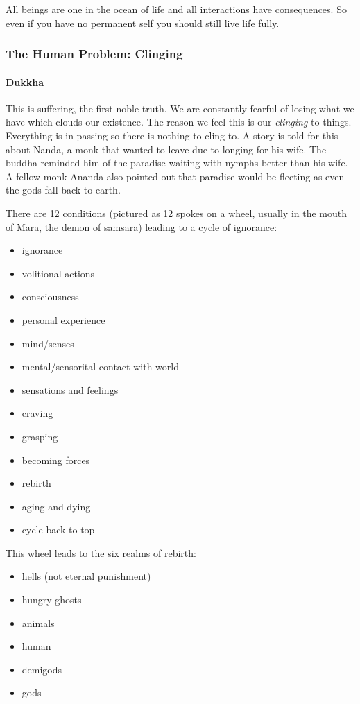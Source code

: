\documentclass{article}
\begin{document}
All beings are one in the ocean of life and all interactions have consequences. So even if you have no permanent self you should still live life fully.

\subsubsection*{The Human Problem: Clinging}
\label{ssub:the_human_problem_clinging}

\paragraph{Dukkha}
\label{par:dukkha}
This is suffering, the first noble truth. We are constantly fearful of losing what we have which clouds our existence. The reason we feel this is our \emph{clinging} to things. Everything is in passing so there is nothing to cling to. A story is told for this about Nanda, a monk that wanted to leave due to longing for his wife. The buddha reminded him of the paradise waiting with nymphs better than his wife. A fellow monk Ananda also pointed out that paradise would be fleeting as even the gods fall back to earth.

There are 12 conditions (pictured as 12 spokes on a wheel, usually in the mouth of Mara, the demon of samsara) leading to a cycle of ignorance:
\begin{itemize}
	\item ignorance
	\item volitional actions
	\item consciousness
	\item personal experience
	\item mind/senses
	\item mental/sensorital contact with world
	\item sensations and feelings
	\item craving
	\item grasping
	\item becoming forces
	\item rebirth
	\item aging and dying
	\item cycle back to top
\end{itemize}

This wheel leads to the six realms of rebirth:
\begin{itemize}
	\item hells (not eternal punishment)
	\item hungry ghosts
	\item animals
	\item human
	\item demigods
	\item gods
\end{itemize}
\end{document}
